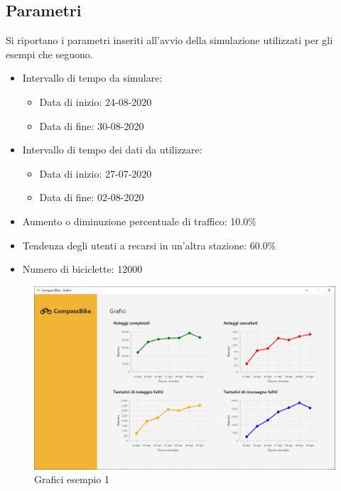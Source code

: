 \documentclass[a4paper, 12pt]{article}
\begin{document}
	\subsection{Parametri}
	Si riportano i parametri inseriti all'avvio della simulazione utilizzati per gli esempi che seguono.
	\begin{itemize}
	\item Intervallo di tempo da simulare:
		\begin{itemize}
		\item Data di inizio: 24-08-2020
		\item Data di fine: 30-08-2020
		\end{itemize}
	\item Intervallo di tempo dei dati da utilizzare:
		\begin{itemize}
		\item Data di inizio: 27-07-2020
		\item Data di fine: 02-08-2020
		\end{itemize}
	\item Aumento o diminuzione percentuale di traffico: 10.0\%
	\item Tendenza degli utenti a recarsi in un'altra stazione: 60.0\%
	\item Numero di biciclette: 12000
	\end{itemize}

	\begin{figure}[H]
	\caption{Grafici esempio 1}
	\label{charts1}
	\hfill \includegraphics[width=\textwidth]{resources/images/screenshot/ChartsExample1.png} \hspace*{\fill}
	\end{figure}
\end{document}
